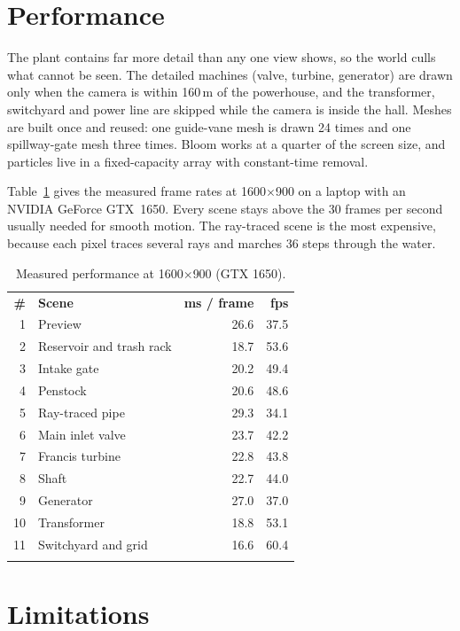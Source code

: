 \documentclass[11pt,a4paper]{report}
\newcommand{\thickhline}{\noalign{\global\setlength{\arrayrulewidth}{0.9pt}}\hline
                         \noalign{\global\setlength{\arrayrulewidth}{0.4pt}}}
\newcommand{\toprule}{\thickhline\noalign{\vskip 2pt}}
\newcommand{\midrule}{\noalign{\vskip 1pt}\hline\noalign{\vskip 2pt}}
\newcommand{\bottomrule}{\noalign{\vskip 1pt}\thickhline}
\begin{document}
\section{Performance}
\label{sec:perf}

The plant contains far more detail than any one view shows, so the world culls what
cannot be seen. The detailed machines (valve, turbine, generator) are drawn only when
the camera is within 160\,m of the powerhouse, and the transformer, switchyard and
power line are skipped while the camera is inside the hall. Meshes are built once and
reused: one guide-vane mesh is drawn 24 times and one spillway-gate mesh three times.
Bloom works at a quarter of the screen size, and particles live in a fixed-capacity
array with constant-time removal.

Table~\ref{tab:fps} gives the measured frame rates at 1600$\times$900 on a laptop with
an NVIDIA GeForce GTX~1650. Every scene stays above the 30 frames per second usually
needed for smooth motion. The ray-traced scene is the most expensive, because each
pixel traces several rays and marches 36 steps through the water.

\begin{table}[!htbp]
\centering
\caption{Measured performance at 1600$\times$900 (GTX 1650).}
\label{tab:fps}
\begin{tabular}{@{}rlrr@{}}
\toprule
\textbf{\#} & \textbf{Scene} & \textbf{ms / frame} & \textbf{fps} \\
\midrule
1 & Preview & 26.6 & 37.5 \\
2 & Reservoir and trash rack & 18.7 & 53.6 \\
3 & Intake gate & 20.2 & 49.4 \\
4 & Penstock & 20.6 & 48.6 \\
5 & Ray-traced pipe & 29.3 & 34.1 \\
6 & Main inlet valve & 23.7 & 42.2 \\
7 & Francis turbine & 22.8 & 43.8 \\
8 & Shaft & 22.7 & 44.0 \\
9 & Generator & 27.0 & 37.0 \\
10 & Transformer & 18.8 & 53.1 \\
11 & Switchyard and grid & 16.6 & 60.4 \\
\bottomrule
\end{tabular}
\end{table}

\section{Limitations}
\end{document}
